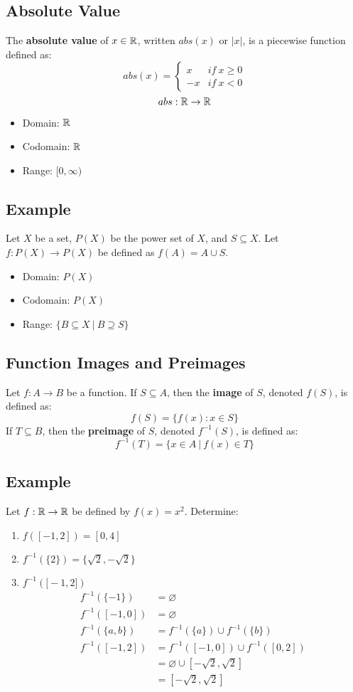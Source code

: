 \documentclass[letterpaper, 12pt]{math}
\begin{document}
\subsection*{Absolute Value}
The \textbf{absolute value} of \( x\in\mathbb{R} \), written \( abs(x) \) or \( |x| \),
is a piecewise function defined as:
\[ abs(x) =
  \begin{cases}
    x & if\ x\geq 0 \\
    -x & if\ x < 0
  \end{cases}
\]
\[ abs:\mathbb{R}\to\mathbb{R} \]
\begin{itemize}
  \item Domain: \( \mathbb{R} \)
  \item Codomain: \( \mathbb{R} \)
  \item Range: \( [0,\infty) \)
\end{itemize}

\subsection*{Example}
Let \( X \) be a set, \( P(X) \) be the power set of \( X \), and
\( S \subseteq X \). Let \( f:P(X)\to P(X) \) be defined as
\( f(A) = A \cup S \).
\begin{itemize}
  \item Domain: \( P(X) \)
  \item Codomain: \( P(X) \)
  \item Range: \( \{B \subseteq X\ |\ B \supseteq S\} \)
\end{itemize}

\subsection*{Function Images and Preimages}
Let \( f:A\to B \) be a function. If \( S \subseteq A \), then the
\textbf{image} of \( S \), denoted \( f(S) \), is defined as:
\[ f(S) = \{f(x):x\in S \} \]
If \( T \subseteq B \), then the \textbf{preimage} of \( S \), denoted
\( f^{-1}(S) \), is defined as:
\[ f^{-1}(T) = \{x\in A\ |\ f(x)\in T\} \]

\subsection*{Example}
Let \( f:\mathbb{R}\to\mathbb{R} \) be defined by \( f(x) = x^{2} \). Determine:
\begin{enumerate}
  \item \( f([-1,2]) = [0,4] \)
  \item \( f^{-1}(\{2\})  = \{\sqrt{2},-\sqrt{2}\} \)
  \item \( f^{-1}(\big[-1,2\big]) \)
  \begin{align*}
    f^{-1}(\{-1\}) &= \varnothing \\
    f^{-1}([-1,0]) &= \varnothing \\
    f^{-1}(\{a,b\}) &= f^{-1}(\{a\}) \cup f^{-1}(\{b\}) \\
    f^{-1}([-1,2]) &= f^{-1}([-1,0]) \cup f^{-1}([0,2]) \\
    &= \varnothing \cup [-\sqrt{2},\sqrt{2}] \\
    &= [-\sqrt{2},\sqrt{2}]
  \end{align*}
\end{enumerate}
\end{document}
